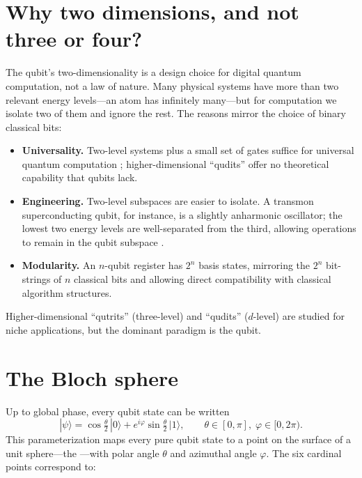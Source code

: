 \section{Why two dimensions, and not three or four?}

The qubit's two-dimensionality is a design choice for digital quantum computation, not a law of nature. Many physical systems have more than two relevant energy levels---an atom has infinitely many---but for computation we isolate two of them and ignore the rest. The reasons mirror the choice of binary classical bits:

\begin{itemize}
  \item \textbf{Universality.} Two-level systems plus a small set of gates suffice for universal quantum computation \citep{barenco_elementary_1995}; higher-dimensional ``qudits'' offer no theoretical capability that qubits lack.
  \item \textbf{Engineering.} Two-level subspaces are easier to isolate. A transmon superconducting qubit, for instance, is a slightly anharmonic oscillator; the lowest two energy levels are well-separated from the third, allowing operations to remain in the qubit subspace \citep{koch_charge-insensitive_2007}.
  \item \textbf{Modularity.} An $n$-qubit register has $2^n$ basis states, mirroring the $2^n$ bit-strings of $n$ classical bits and allowing direct compatibility with classical algorithm structures.
\end{itemize}

Higher-dimensional ``qutrits'' (three-level) and ``qudits'' ($d$-level) are studied for niche applications, but the dominant paradigm is the qubit.

\section{The Bloch sphere}

Up to global phase, every qubit state can be written
\[
  |\psi\rangle = \cos\tfrac{\theta}{2}\,|0\rangle + e^{i\varphi}\sin\tfrac{\theta}{2}\,|1\rangle, \qquad \theta\in[0,\pi],\;\varphi\in[0,2\pi).
\]
This parameterization maps every pure qubit state to a point on the surface of a unit sphere---the ---with polar angle $\theta$ and azimuthal angle $\varphi$. The six cardinal points correspond to:

